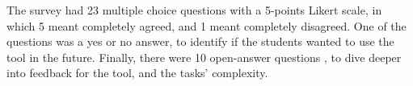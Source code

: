The survey had 23 multiple choice questions with a 5-points Likert scale,  in which 5 meant completely agreed, and 1 meant completely disagreed. One of the questions was a yes or no answer, to identify if the students wanted to use the tool in the future. Finally, there were 10 open-answer questions , to dive deeper into feedback for the tool, and the tasks' complexity.





\endinput

